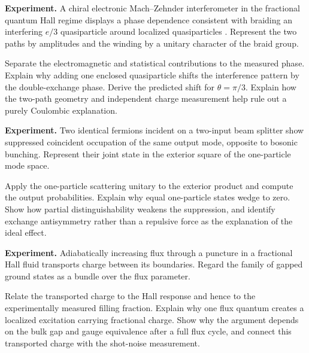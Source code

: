 \begin{exercise}
\textbf{Experiment.}
A chiral electronic Mach--Zehnder interferometer in the fractional quantum
Hall regime displays a phase dependence consistent with braiding an
interfering \(e/3\) quasiparticle around localized quasiparticles
\cite{kundu}.  Represent the two paths by amplitudes and the winding by a
unitary character of the braid group.

Separate the electromagnetic and statistical contributions to the measured
phase.  Explain why adding one enclosed quasiparticle shifts the interference
pattern by the double-exchange phase.  Derive the predicted shift for
\(\theta=\pi/3\).  Explain how the two-path geometry and independent charge
measurement help rule out a purely Coulombic explanation.
\end{exercise}

\begin{exercise}
\textbf{Experiment.}
Two identical fermions incident on a two-input beam splitter show suppressed
coincident occupation of the same output mode, opposite to bosonic bunching.
Represent their joint state in the exterior square of the one-particle mode
space.

Apply the one-particle scattering unitary to the exterior product and compute
the output probabilities.  Explain why equal one-particle states wedge to
zero.  Show how partial distinguishability weakens the suppression, and
identify exchange antisymmetry rather than a repulsive force as the
explanation of the ideal effect.
\end{exercise}

\begin{exercise}
\textbf{Experiment.}
Adiabatically increasing flux through a puncture in a fractional Hall fluid
transports charge between its boundaries.  Regard the family of gapped ground
states as a bundle over the flux parameter.

Relate the transported charge to the Hall response and hence to the
experimentally measured filling fraction.  Explain why one flux quantum
creates a localized excitation carrying fractional charge.  Show why the
argument depends on the bulk gap and gauge equivalence after a full flux
cycle, and connect this transported charge with the shot-noise measurement.
\end{exercise}

